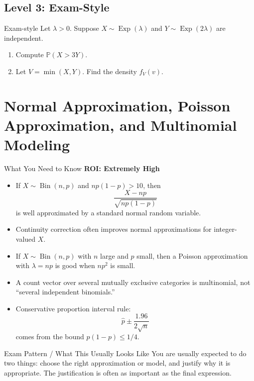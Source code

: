 \documentclass[12pt]{article}
\newcommand{\PP}{\mathbb{P}}
\newcommand{\Bin}{\operatorname{Bin}}
\newcommand{\Exp}{\operatorname{Exp}}
\newcommand{\writespace}[1]{\vspace*{#1}}
\newcommand{\xlongws}{\writespace{4.1cm}}
\newcommand{\roiline}[1]{\textbf{ROI: #1}}
\newcounter{problem}[section]
\begin{document}
\subsection*{Level 3: Exam-Style}

\begin{practiceproblem}{Exam-style}
Let $\lambda>0$. Suppose $X\sim\Exp(\lambda)$ and $Y\sim\Exp(2\lambda)$ are independent.
\begin{enumerate}
  \item Compute $\PP(X>3Y)$.
  \item Let $V=\min(X,Y)$. Find the density $f_V(v)$.
\end{enumerate}
\end{practiceproblem}
\xlongws

\clearpage

\section{Normal Approximation, Poisson Approximation, and Multinomial Modeling}

\begin{summarybox}{What You Need to Know}
\roiline{Extremely High}
\begin{itemize}
  \item If $X\sim\Bin(n,p)$ and $np(1-p)>10$, then
  \[
    \frac{X-np}{\sqrt{np(1-p)}}
  \]
  is well approximated by a standard normal random variable.
  \item Continuity correction often improves normal approximations for integer-valued $X$.
  \item If $X\sim\Bin(n,p)$ with $n$ large and $p$ small, then a Poisson approximation with $\lambda=np$ is good when $np^2$ is small.
  \item A count vector over several mutually exclusive categories is multinomial, not ``several independent binomials.''
  \item Conservative proportion interval rule:
  \[
    \hat p \pm \frac{1.96}{2\sqrt n}
  \]
  comes from the bound $p(1-p)\le 1/4$.
\end{itemize}
\end{summarybox}

\begin{patternbox}{Exam Pattern / What This Usually Looks Like}
You are usually expected to do two things: choose the right approximation or model, and justify why it is appropriate. The justification is often as important as the final expression.
\end{patternbox}
\end{document}
